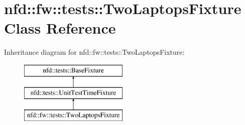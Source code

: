 \hypertarget{classnfd_1_1fw_1_1tests_1_1TwoLaptopsFixture}{}\section{nfd\+:\+:fw\+:\+:tests\+:\+:Two\+Laptops\+Fixture Class Reference}
\label{classnfd_1_1fw_1_1tests_1_1TwoLaptopsFixture}
Inheritance diagram for nfd\+:\+:fw\+:\+:tests\+:\+:Two\+Laptops\+Fixture\+:\begin{figure}[H]
\begin{center}
\leavevmode
\includegraphics[height=3.000000cm]{classnfd_1_1fw_1_1tests_1_1TwoLaptopsFixture}
\end{center}
\end{figure}
